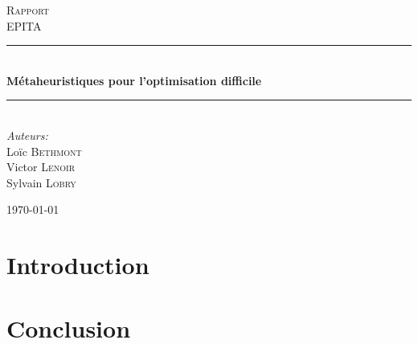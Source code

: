 \documentclass{report}
\newcommand{\HRule}{\rule{\linewidth}{0.5mm}}
\begin{document}
\begin{titlepage}

\begin{center}

\textsc{\LARGE Rapport}\\[1.5cm]

\textsc{\Large EPITA}\\[0.5cm]

\HRule \\[0.4cm]
{ \huge \bfseries Métaheuristiques pour l'optimisation difficile}\\[0.4cm]

\HRule \\[1.5cm]

\large
\emph{Auteurs:}\\
Loïc \textsc{Bethmont}\\
Victor \textsc{Lenoir}\\
Sylvain \textsc{Lobry}\\

\vfill

{\large \today}

\end{center}

\end{titlepage}
\newpage
\tableofcontents
\newpage

\chapter{Introduction}


\chapter{Conclusion}
\end{document}
